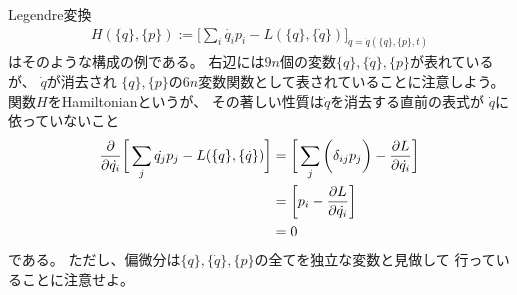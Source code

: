 \documentclass[dvipdfmx]{jsarticle}
\begin{document}
Legendre変換
\begin{align}
  H(\{q\},\{p\})
  :=
  \bigg[
    \sum_i 
      \dot{q_i} p_i
  - L(\{q\}, \{\dot{q}\})
  \bigg]_{\dot{q} = \dot{q}(\{q\},\{p\},t)}
\end{align}
はそのような構成の例である。
右辺には$9n$個の変数$\{q\},\{\dot{q}\},\{p\}$が表れているが、
$\dot{q}$が消去され
$\{q\},\{p\}$の$6n$変数関数として表されていることに注意しよう。
関数$H$をHamiltonianというが、
その著しい性質は$\dot{q}$を消去する直前の表式が
$\dot{q}$に依っていないこと
\begin{align}
  \dfrac{\partial}{\partial \dot{q_i}}
  \bigg[
    \sum_j
      \dot{q_j} p_j
  - L(\{q\}, \{\dot{q}\})
  \bigg]
  &=
  \bigg[
    \sum_j\bigg(
      \delta_{ij} p_j
    \bigg)
  - \dfrac{\partial L}{\partial \dot{q_i}}
  \bigg]
\notag\\&=
  \bigg[
    p_i
    - \dfrac{\partial L}{\partial \dot{q_i}}
  \bigg]
\notag\\
  &=0
\end{align}
である。
ただし、偏微分は$\{q\},\{\dot{q}\},\{p\}$の全てを独立な変数と見做して
行っていることに注意せよ。
\end{document}
